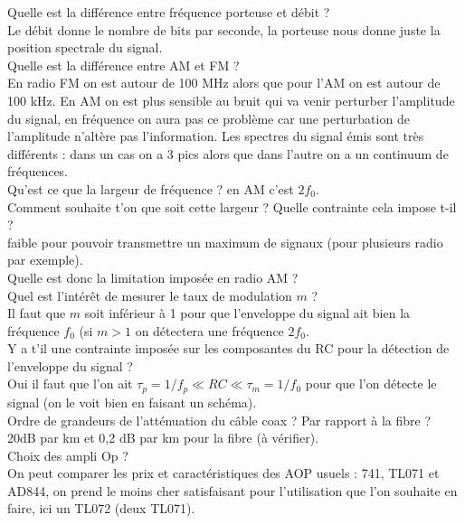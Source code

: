 \documentclass[12pt,prb,aps,epsf]{article}
\begin{document}
Quelle est la différence entre fréquence porteuse et débit ?\\
Le débit donne le nombre de bits par seconde, la porteuse nous donne juste la position spectrale du signal.\\

Quelle est la différence entre AM et FM ?\\
En radio FM on est autour de 100 MHz alors que pour l'AM on est autour de 100 kHz. En AM on est plus sensible au bruit qui va venir perturber l'amplitude du signal, en fréquence on aura pas ce problème car une perturbation de l'amplitude n'altère pas l'information. Les spectres du signal émis sont très différents : dans un cas on a 3 pics alors que dans l'autre on a un continuum de fréquences.\\

Qu'est ce que la largeur de fréquence ?
en AM c'est $2f_0$.\\

Comment souhaite t'on que soit cette largeur ? Quelle contrainte cela impose t-il ?\\
faible pour pouvoir transmettre un maximum de signaux (pour plusieurs radio par exemple).\\

Quelle est donc la limitation imposée en radio AM ?\\

Quel est l'intérêt de mesurer le taux de modulation $m$ ?\\
Il faut que $m$ soit inférieur à 1 pour que l'enveloppe du signal ait bien la fréquence $f_0$ (si $m>1$ on détectera une fréquence $2f_0$.\\

Y a t'il une contrainte imposée sur les composantes du RC pour la détection de l'enveloppe du signal ?\\
Oui il faut que l'on ait $\tau_p = 1/f_p \ll RC \ll \tau_m = 1/f_
0$ pour que l'on détecte le signal (on le voit bien en faisant un schéma).\\

Ordre de grandeurs de l'atténuation du câble coax ? Par rapport à la fibre ?\\
20dB par km et 0,2 dB par km pour la fibre (à vérifier).\\

Choix des ampli Op ?\\
On peut comparer les prix et caractéristiques des AOP usuels : 741, TL071 et AD844, on prend le moins cher satisfaisant pour l'utilisation que l'on souhaite en faire, ici un TL072 (deux TL071).
\end{document}
